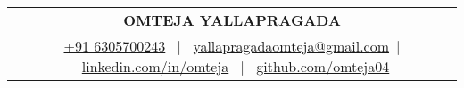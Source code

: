 \documentclass[a4paper,10pt]{article}
\begin{document}
\pagestyle{empty} 

\hypersetup{
    colorlinks,
    breaklinks,
    urlcolor=linkcolour,
    linkcolor=linkcolour
}


\hypersetup{urlcolor=blackcolour, linkcolor=blackcolour}
\begin{tabularx}{\linewidth}{@{} C @{}}
{\textbf{\Huge{OMTEJA YALLAPRAGADA}}} \\[7.5pt]
\href{tel:+916305700243}{+91 6305700243} \ $|$ \ 
\href{mailto:yallapragadaomteja@gmail.com}{yallapragadaomteja@gmail.com}\ $|$ \ 
\href{https://linkedin.com/in/omteja}{linkedin.com/in/omteja} \ $|$ \
\href{https://github.com/omteja04}{github.com/omteja04}  \\
\end{tabularx} 

\end{document}

